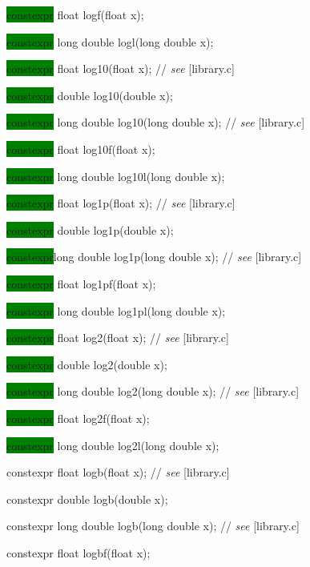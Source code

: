 \documentclass[prd,twocolumn,amsmath,amssymb,nofootinbib,eqsecnum]{revtex4-1}
\newcommand{\highlight}[1]{\colorbox{green}{\!\!\!\! #1}}
\newcommand{\oldhighlight}[1]{#1}
\newcommand{\stdcomment}[1]{{// {\it see} [#1]}}
\begin{document}
{\highlight{constexpr} float logf(float x);

\highlight{constexpr} long double logl(long double x);

\vspace{2ex}


\highlight{constexpr} float log10(float x); \stdcomment{library.c}

\highlight{constexpr} double log10(double x);

\highlight{constexpr} long double log10(long double x); \stdcomment{library.c}

\highlight{constexpr} float log10f(float x);

\highlight{constexpr} long double log10l(long double x);

\vspace{2ex}


\highlight{constexpr} float log1p(float x); \stdcomment{library.c}

\highlight{constexpr} double log1p(double x);

\highlight{constexpr}long double log1p(long double x); \stdcomment{library.c}

\highlight{constexpr} float log1pf(float x);

\highlight{constexpr} long double log1pl(long double x);

\vspace{2ex}


\highlight{constexpr} float log2(float x); \stdcomment{library.c}

\highlight{constexpr} double log2(double x);

\highlight{constexpr} long double log2(long double x); \stdcomment{library.c}

\highlight{constexpr} float log2f(float x);

\highlight{constexpr} long double log2l(long double x);

\vspace{2ex}


\oldhighlight{constexpr} float logb(float x); \stdcomment{library.c}

\oldhighlight{constexpr} double logb(double x);

\oldhighlight{constexpr} long double logb(long double x); \stdcomment{library.c}

\oldhighlight{constexpr} float logbf(float x);

}
\end{document}
